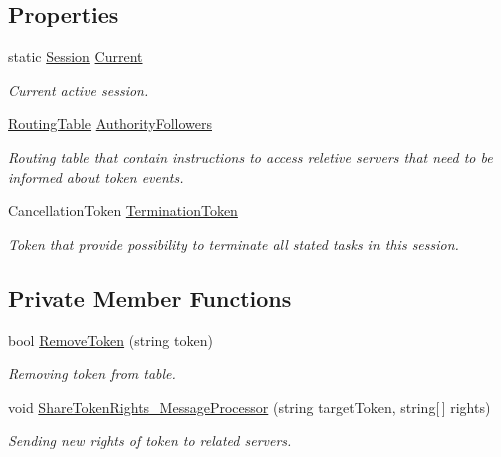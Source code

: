 \subsection*{Properties}
\begin{DoxyCompactItemize}
\item 
static \mbox{\hyperlink{class_authority_controller_1_1_session}{Session}} \mbox{\hyperlink{class_authority_controller_1_1_session_a20d84345a3843b7a1b340887bb961f7c}{Current}}
\begin{DoxyCompactList}\small\item\em Current active session. \end{DoxyCompactList}\item 
\mbox{\hyperlink{class_pipes_provider_1_1_networking_1_1_routing_1_1_routing_table}{Routing\+Table}} \mbox{\hyperlink{class_authority_controller_1_1_session_a6a8a683e8b0d236d2808cbd9130c0b99}{Authority\+Followers}}
\begin{DoxyCompactList}\small\item\em Routing table that contain instructions to access reletive servers that need to be informed about token events. \end{DoxyCompactList}\item 
Cancellation\+Token \mbox{\hyperlink{class_authority_controller_1_1_session_a531bf4c153a454ac5236366a1e684619}{Termination\+Token}}
\begin{DoxyCompactList}\small\item\em Token that provide possibility to terminate all stated tasks in this session. \end{DoxyCompactList}\end{DoxyCompactItemize}
\subsection*{Private Member Functions}
\begin{DoxyCompactItemize}
\item 
bool \mbox{\hyperlink{class_authority_controller_1_1_session_a8422d53f01daff616c1588cb3d657882}{Remove\+Token}} (string token)
\begin{DoxyCompactList}\small\item\em Removing token from table. \end{DoxyCompactList}\item 
void \mbox{\hyperlink{class_authority_controller_1_1_session_aea2ab13cf2e1cd192ef5e49935508b5b}{Share\+Token\+Rights\+\_\+\+Message\+Processor}} (string target\+Token, string\mbox{[}$\,$\mbox{]} rights)
\begin{DoxyCompactList}\small\item\em Sending new rights of token to related servers. \end{DoxyCompactList}\end{DoxyCompactItemize}
